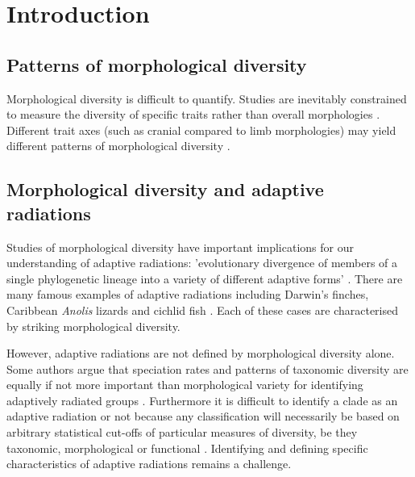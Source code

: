 \chapter{Introduction}
\label{chap:introduction}


\noindent


\section{Patterns of morphological diversity}



	Morphological diversity is difficult to quantify. Studies are inevitably constrained to measure the diversity of specific traits rather than overall morphologies \citep{Roy1997}. Different trait axes (such as cranial compared to limb morphologies) may yield different patterns of morphological diversity \citep{Foth2012}.

	


\section{Morphological diversity and adaptive radiations}

	Studies of morphological diversity have important implications for our understanding of adaptive radiations: 'evolutionary divergence of members of a single phylogenetic lineage into a variety of different adaptive forms' \citep[Futuyama 1998, cired by][]{Losos2010}.
	There are many famous examples of adaptive radiations including Darwin's finches, Caribbean \textit{Anolis} lizards and cichlid fish \citep{Gavrilets2009}. Each of these cases are characterised by striking morphological diversity.
	
	However, adaptive radiations are not defined by morphological diversity alone. Some authors argue that speciation rates and patterns of taxonomic diversity are equally if not more important than morphological variety for identifying adaptively radiated groups \citep{Glor2010, Losos2010a}. Furthermore it is difficult to identify a clade as an adaptive radiation or not because any classification will necessarily be based on arbitrary statistical cut-offs of particular measures of diversity, be they taxonomic, morphological or functional \citep{Olson2009}. Identifying and defining specific characteristics of adaptive radiations remains a challenge.
	
